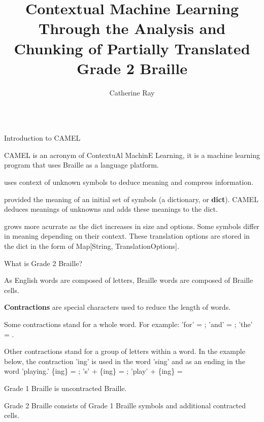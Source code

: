 \documentclass[final]{beamer}
\title[Fancy Posters]{Contextual Machine Learning Through the Analysis and Chunking of Partially Translated Grade 2 Braille}
\author[author]{Catherine Ray}
\institute[George Mason University]{Dr. Muffarah Jahangeer, Dr. Joseph Marr}
\begin{document}
\begin{frame}{} 
\begin{columns}[t]

  \begin{column}{.3\linewidth}
    \vfill

\vspace{-50pt}   
    \begin{block}{{\small Introduction to CAMEL}}
	\begin{itemize} {\scriptsize
	\item CAMEL is an acronym of \alert{C}ontextu\alert{A}l \alert{M}achin\alert{E} \alert{L}earning, it is a machine learning program that uses Braille as a language platform.
	\item uses context of unknown symbols to deduce meaning and compress information.
	\item provided the meaning of an initial set of symbols (a dictionary, or \textbf{dict}). CAMEL deduces meanings of unknowns and adds these meanings to the dict.
	\item grows more acurrate as the dict increases in size and options. Some symbols differ in meaning depending on their context. These translation options are stored in the dict in the form of Map[String, TranslationOptions].
\item }

\end{itemize}
\vspace{-60pt}  
\end{block}
    \begin{block}{{\small What is Grade 2 Braille?}}
        \begin{itemize} {\scriptsize
	\item As English words are composed of letters, Braille words are composed of Braille cells.
	\item \textbf{Contractions} are special characters used to reduce the length of words. 
	\item Some contractions stand for a whole word. \newline For example: 'for' =   ; 'and' = ; 'the' = . 
	\item Other contractions stand for a group of letters within a word. In the example below, the contraction 'ing' is used in the word 'sing' and as an ending in the word 'playing.'  \newline \{ing\} =  ; 's' + \{ing\} = ; 'play' + \{ing\} = 
	\item Grade 1 Braille is uncontracted Braille.
	\item Grade 2 Braille consists of Grade 1 Braille symbols and additional contracted cells.
\item }
        \end{itemize}
\vspace{-50pt}  
    \end{block}


\end{column}
\end{columns}
\end{frame}
\end{document}
